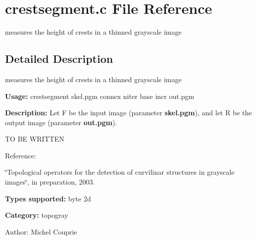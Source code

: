 \section{crestsegment.c File Reference}
\label{crestsegment_8c}
measures the height of crests in a thinned grayscale image 



\subsection{Detailed Description}
measures the height of crests in a thinned grayscale image 

{\bf Usage:} crestsegment skel.pgm connex niter base incr out.pgm

{\bf Description:} Let F be the input image (parameter {\bf skel.pgm}), and let R be the output image (parameter {\bf out.pgm}).

TO BE WRITTEN

Reference:\par
 \char`\"{}Topological operators for the detection of curvilinar structures in grayscale images\char`\"{}, in preparation, 2003.

{\bf Types supported:} byte 2d

{\bf Category:} topogray

\begin{Desc}
\item[Author:]Michel Couprie \end{Desc}
